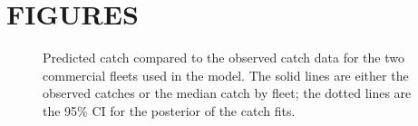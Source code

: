 \documentclass[11pt]{book}
\begin{document}
\frontmatter


\hypertarget{figures}{%
\section{FIGURES}\label{figures}}




\begin{figure}[H]

{\centering {} 

}

\caption{Predicted catch compared to the observed catch data for the two commercial fleets used in the model. The solid lines are either the observed catches or the median catch by fleet; the dotted lines are the 95\% CI for the posterior of the catch fits.}\label{fig:fig-catch-fit}
\end{figure}
\end{document}
